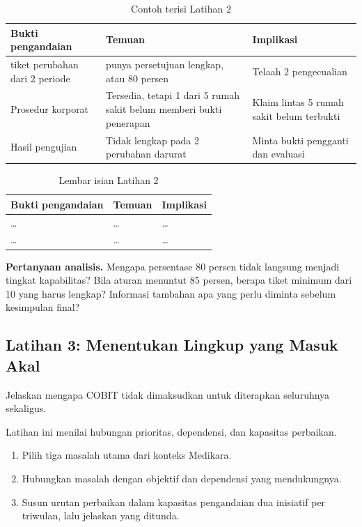 \begin{table}[!htb]
  \centering\small
  \caption{Contoh terisi Latihan 2}\label{tab:ch04-lat2-contoh}
  \begin{tabularx}{\textwidth}{|>{\raggedright\arraybackslash}p{}|>{\raggedright\arraybackslash}X|>{\raggedright\arraybackslash}X|}
    \hline
    \textbf{Bukti pengandaian} & \textbf{Temuan} & \textbf{Implikasi} \\ \hline
    10 tiket perubahan dari 2 periode & 8 punya persetujuan lengkap, atau 80 persen & Telaah 2 pengecualian \\ \hline
    Prosedur korporat & Tersedia, tetapi 1 dari 5 rumah sakit belum memberi bukti penerapan & Klaim lintas 5 rumah sakit belum terbukti \\ \hline
    Hasil pengujian & Tidak lengkap pada 2 perubahan darurat & Minta bukti pengganti dan evaluasi \\ \hline
  \end{tabularx}
\end{table}

\begin{table}[!htb]
  \centering\small
  \caption{Lembar isian Latihan 2}\label{tab:ch04-lat2-hasil}
  \begin{tabularx}{\textwidth}{|>{\raggedright\arraybackslash}p{}|>{\raggedright\arraybackslash}X|>{\raggedright\arraybackslash}X|}
    \hline
    \textbf{Bukti pengandaian} & \textbf{Temuan} & \textbf{Implikasi} \\ \hline
    \dots & \dots & \dots \\ \hline
    \dots & \dots & \dots \\ \hline
  \end{tabularx}
\end{table}

\textbf{Pertanyaan analisis.} Mengapa persentase 80 persen tidak langsung menjadi tingkat kapabilitas? Bila aturan menuntut 85 persen, berapa tiket minimum dari 10 yang harus lengkap? Informasi tambahan apa yang perlu diminta sebelum kesimpulan final?

\subsection*{Latihan 3: Menentukan Lingkup yang Masuk Akal}

Jelaskan mengapa COBIT tidak dimaksudkan untuk diterapkan seluruhnya sekaligus.

Latihan ini menilai hubungan prioritas, dependensi, dan kapasitas perbaikan.
\begin{enumerate}
  \item Pilih tiga masalah utama dari konteks Medikara.
  \item Hubungkan masalah dengan objektif dan dependensi yang mendukungnya.
  \item Susun urutan perbaikan dalam kapasitas pengandaian dua inisiatif per triwulan, lalu jelaskan yang ditunda.
\end{enumerate}


